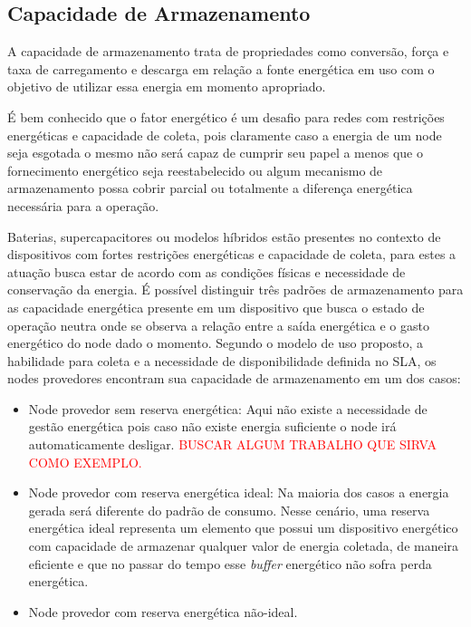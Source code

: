 \subsection{Capacidade de Armazenamento}
A capacidade de armazenamento trata de propriedades como conversão, força e taxa de carregamento e descarga em relação a fonte energética em uso com o objetivo de utilizar essa energia em momento apropriado. 

É bem conhecido que o fator energético é um desafio para redes com restrições energéticas e capacidade de coleta, pois claramente caso a energia de um node seja esgotada o mesmo não será capaz de cumprir seu papel a menos que o fornecimento energético seja reestabelecido ou algum mecanismo de armazenamento possa cobrir parcial ou totalmente a diferença energética necessária para a operação.

Baterias, supercapacitores ou modelos híbridos estão presentes no contexto de dispositivos com fortes restrições energéticas e capacidade de coleta, para estes a atuação busca estar de acordo com as condições físicas e necessidade de conservação da energia. É possível distinguir três padrões de armazenamento para as capacidade energética presente em um dispositivo que busca o estado de operação neutra onde se observa a relação entre a saída energética e o gasto energético do node dado o momento. Segundo o modelo de uso proposto, a habilidade para coleta e a necessidade de disponibilidade definida no \acs{SLA}, os nodes provedores encontram sua capacidade de armazenamento em um dos casos:

\begin{itemize}
    \item Node provedor sem reserva energética: Aqui não existe a necessidade de gestão energética pois caso não existe energia suficiente o node irá automaticamente desligar. \textcolor{red}{BUSCAR ALGUM TRABALHO QUE SIRVA COMO EXEMPLO.}
    
    \item Node provedor com reserva energética ideal: Na maioria dos casos a energia gerada será diferente do padrão de consumo. Nesse cenário, uma reserva energética ideal representa um elemento que possui um dispositivo energético com capacidade de armazenar qualquer valor de energia coletada, de maneira eficiente e que no passar do tempo esse \textit{buffer} energético não sofra perda energética. 
    
    \item Node provedor com reserva energética não-ideal.
\end{itemize}

